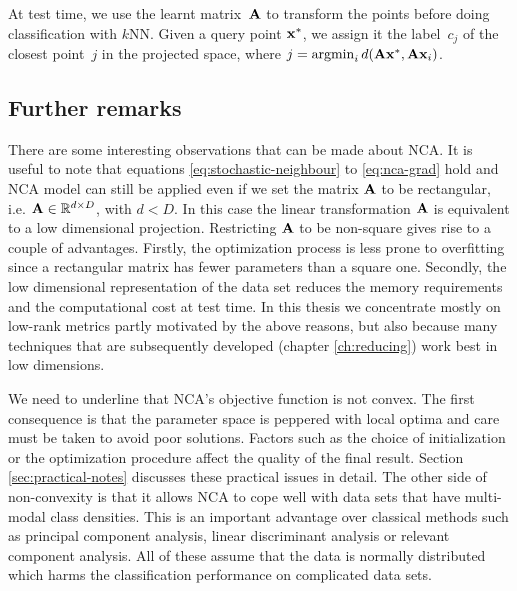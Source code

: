 	At test time, we use the learnt matrix~$\mathbf{A}$ to transform the points before doing classification with $k$NN. Given a query point $\mathbf{x}^*$, we assign it the label~$c_j$ of the closest point~$j$ in the projected space, where $j = \operatorname{argmin}_{i}d(\mathbf{A}\mathbf{x}^*,\mathbf{A}\mathbf{x}_i)$.

	\subsection*{Further remarks}
	
	There are some interesting observations that can be made about NCA. It is useful to note that equations \eqref{eq:stochastic-neighbour} to \eqref{eq:nca-grad} hold and NCA model can still be applied even if we set the matrix $\mathbf{A}$ to be rectangular, i.e. $\mathbf{A}\in\mathbb{R}^{d\times D}$, with $d<D$.  In this case the linear transformation $\mathbf{A}$ is equivalent to a low dimensional projection. Restricting $\mathbf{A}$ to be non-square gives rise to a couple of advantages. Firstly, the optimization process is less prone to overfitting since a rectangular matrix has fewer parameters than a square one. Secondly, the low dimensional representation of the data set reduces the memory requirements and the computational cost at test time. In this thesis we concentrate mostly on low-rank metrics partly motivated by the above reasons, but also because many techniques that are subsequently developed (chapter \ref{ch:reducing}) work best in low dimensions.


	We need to underline that NCA's objective function is not convex. The first consequence is that the parameter space is peppered with local optima and care must be taken to avoid poor solutions. Factors such as the choice of initialization or the optimization procedure affect the quality of the final result. Section \ref{sec:practical-notes} discusses these practical issues in detail. The other side of non-convexity is that it allows NCA to cope well with data sets that have multi-modal class densities. This is an important advantage over classical methods such as principal component analysis, linear discriminant analysis or relevant component analysis. All of these assume that the data is normally distributed which harms the classification performance on complicated data sets.


